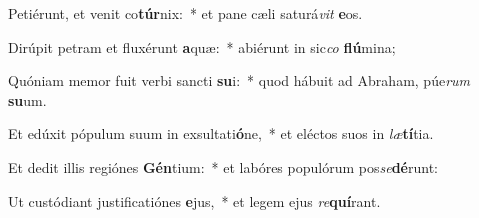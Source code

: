 \item Petiérunt, et venit co\textbf{túr}nix:~* et pane cæli saturá\textit{vit} \textbf{e}os.
\item Dirúpit petram et fluxérunt \textbf{a}quæ:~* abiérunt in sic\textit{co} \textbf{flú}mina;
\item Quóniam memor fuit verbi sancti \textbf{su}i:~* quod hábuit ad Abraham, púe\textit{rum} \textbf{su}um.
\item Et edúxit pópulum suum in exsultati\textbf{ó}ne,~* et eléctos suos in \textit{læ}\textbf{tí}tia.
\item Et dedit illis regiónes \textbf{Gén}tium:~* et labóres populórum pos\textit{se}\textbf{dé}runt:
\item Ut custódiant justificatiónes \textbf{e}jus,~* et legem ejus \textit{re}\textbf{quí}rant.
